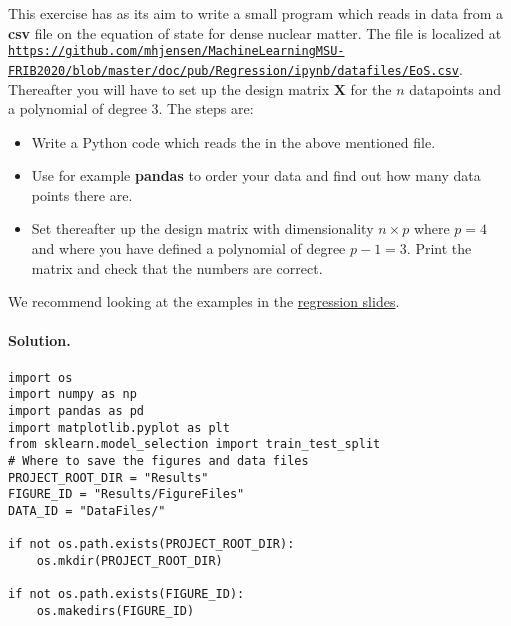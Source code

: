 \documentclass[%
oneside,                 %
final,                   %
10pt]{article}
\newenvironment{doconceexercise}{}{}
\newcounter{doconceexercisecounter}
\begin{document}
\begin{doconceexercise}



This exercise has as its aim to write a small program which reads in data from a \textbf{csv} file on the equation of state for dense nuclear matter. The file is localized at \href{{https://github.com/mhjensen/MachineLearningMSU-FRIB2020/blob/master/doc/pub/Regression/ipynb/datafiles/EoS.csv}}{\nolinkurl{https://github.com/mhjensen/MachineLearningMSU-FRIB2020/blob/master/doc/pub/Regression/ipynb/datafiles/EoS.csv}}. Thereafter you will have to set up the design matrix $\bm{X}$ for the  $n$
datapoints and a polynomial of degree $3$. The steps are:
\begin{itemize}
\item Write a Python code which reads the in the above mentioned file.

\item Use for example \textbf{pandas} to order your data and find out how many data points there are.

\item Set thereafter up the design matrix with dimensionality $n\times p$ where $p=4$ and where you have defined a polynomial of degree $p-1=3$. Print the matrix and check that the numbers are correct. 
\end{itemize}

\noindent
We recommend looking at the examples in the \href{{https://compphysics.github.io/MachineLearning/doc/pub/Regression/html/Regression-bs.html}}{regression slides}.


\paragraph{Solution.}
\begin{verbatim}
import os
import numpy as np
import pandas as pd
import matplotlib.pyplot as plt
from sklearn.model_selection import train_test_split
# Where to save the figures and data files
PROJECT_ROOT_DIR = "Results"
FIGURE_ID = "Results/FigureFiles"
DATA_ID = "DataFiles/"

if not os.path.exists(PROJECT_ROOT_DIR):
    os.mkdir(PROJECT_ROOT_DIR)

if not os.path.exists(FIGURE_ID):
    os.makedirs(FIGURE_ID)


\end{verbatim}
\end{doconceexercise}
\end{document}
